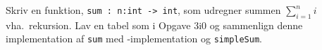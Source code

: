 Skriv en funktion, \lstinline{sum : n:int -> int}, som udregner summen $\sum_{i=1}^ni$ vha.\ rekursion. Lav en tabel som i Opgave 3i0 og sammenlign denne implementation af \lstinline{sum} med -implementation og \lstinline{simpleSum}.

